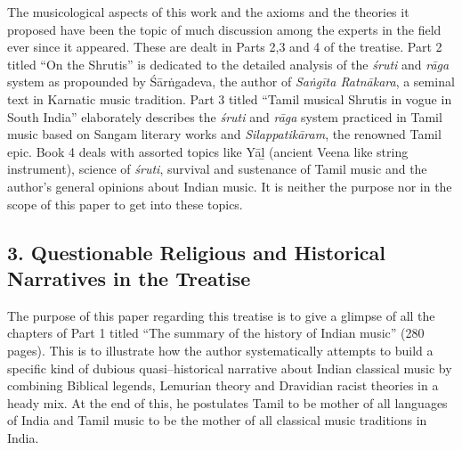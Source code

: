 The musicological aspects of this work and the axioms and the theories it proposed have been the topic of much discussion among the experts in the field ever since it appeared. These are dealt in Parts 2,3 and 4 of the treatise. Part 2 titled “On the Shrutis” is dedicated to the detailed analysis of the \textit{śruti} and \textit{rāga} system as propounded by Śārṅgadeva, the author of \textit{Saṅgīta Ratnākara}, a seminal text in Karnatic music tradition. Part 3 titled “Tamil musical Shrutis in vogue in South India” elaborately describes the \textit{śruti} and \textit{rāga} system practiced in Tamil music based on Sangam literary works and \textit{Silappatikāram}, the renowned Tamil epic. Book 4 deals with assorted topics like Yāḻ (ancient Veena like string instrument), science of \textit{śruti}, survival and sustenance of Tamil music and the author’s general opinions about Indian music. It is neither the purpose nor in the scope of this paper to get into these topics.

\vspace{-.2cm}

\subsection*{3. Questionable Religious and Historical Narratives in the Treatise}

The purpose of this paper regarding this treatise is to give a glimpse of all the chapters of Part 1 titled “The summary of the history of Indian music” (280 pages). This is to illustrate how the author systematically attempts to build a specific kind of dubious quasi–historical narrative about Indian classical music by combining Biblical legends, Lemurian theory and Dravidian racist theories in a heady mix. At the end of this, he postulates Tamil to be mother of all languages of India and Tamil music to be the mother of all classical music traditions in India.

